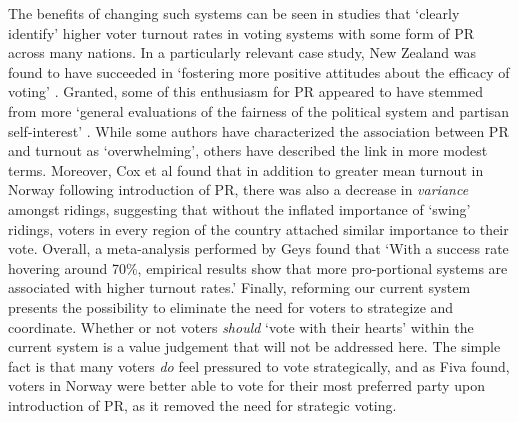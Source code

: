 

The benefits of changing such systems can be seen in studies that `clearly identify' higher voter turnout rates in voting systems with some form of PR\cite{Blais_1990} across many nations.
In a particularly relevant case study, New Zealand was found to have succeeded in `fostering more positive attitudes about the efficacy of voting' \cite{Karp_Banducci}. Granted, some of this enthusiasm for PR appeared to have stemmed from more `general evaluations of the fairness of the political system and partisan self-interest' \cite{Banducci_Karp}.
While some authors have characterized the association between PR and turnout as `overwhelming'\cite{Selb}, others have described the link in more modest terms.
Moreover, Cox et al found that in addition to greater mean turnout in Norway following introduction of PR, there was also a decrease in \emph{variance} amongst ridings, suggesting that without the inflated importance of `swing' ridings, voters in every region of the country attached similar importance to their vote\cite{Cox_2016}.
Overall, a meta-analysis performed by Geys\cite{Geys_2006} found that `With a success rate hovering around 70\%, empirical results show that more pro-portional systems are associated with higher turnout rates.'
Finally, reforming our current system presents the possibility to eliminate the need for voters to strategize and coordinate. Whether or not voters \emph{should} `vote with their hearts' within the current system is a value judgement that will not be addressed here. The simple fact is that many voters \emph{do} feel pressured to vote strategically, and as Fiva found, voters in Norway were better able to vote for their most preferred party upon introduction of PR, as it removed the need for strategic voting\cite{Fiva}.

